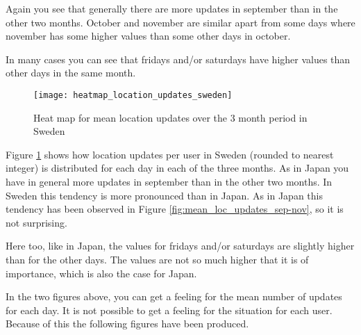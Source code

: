 Again you see that generally there are more updates in september than in the other two months. October and november are similar apart from some days where november has some higher values than some other days in october. 

In many cases you can see that fridays and/or saturdays have higher values than other days in the same month. 


 




\begin{figure}[H]
    \hspace*{-1.5cm}
    \centering
    \texttt{[image: heatmap\_location\_updates\_sweden]}
    \caption{Heat map for mean location updates over the 3 month period in Sweden}
    \label{fig:heatmap_swe}
\end{figure}

Figure \ref{fig:heatmap_swe} shows how location updates per user in Sweden (rounded to nearest integer) is distributed for each day in each of the three months. As in Japan you have in general more updates in september than in the other two months. In Sweden this tendency is more pronounced than in Japan. As in Japan this tendency has been observed in Figure \ref{fig:mean_loc_updates_sep-nov}, so it is not surprising.  
 
Here too, like in Japan, the values for fridays and/or saturdays are slightly higher than for the other days. The values are not so much higher that it is of importance, which is also the case for Japan. 

In the two figures above, you can get a feeling for the mean number of updates for each day. It is not possible to get a feeling for the situation for each user. Because of this the following figures have been produced. 

